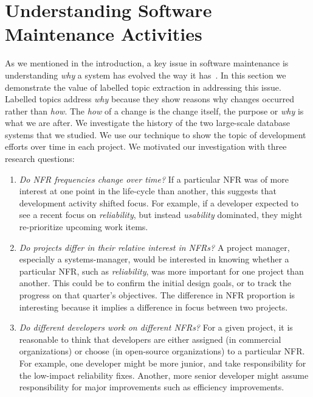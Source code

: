 \documentclass[smallextended]{svjour3}       %
\begin{document}
\section{Understanding Software Maintenance Activities} 
\label{sec:analysis}
As we mentioned in the introduction, a key issue in software maintenance is understanding \emph{why} a system has evolved the way it has~\cite{aranda09icse}. 
In this section we demonstrate the value of labelled topic extraction
in addressing this issue. 
Labelled topics address \emph{why}  because they show reasons why changes
occurred rather than \emph{how}. 
The \emph{how} of a change is the change itself, the purpose or
\emph{why} is what we are after.
We investigate the history of the two large-scale database systems that we studied. 
We use our technique to show the topic of development efforts over time in each project.
We motivated our investigation with three research questions:
\begin{enumerate}
\item \emph{Do NFR frequencies change over time?} If a particular NFR
  was of more interest at one point in the life-cycle than another,
  this suggests that development activity shifted focus. For example,
  if a developer expected to see a recent focus on \emph{reliability},
  but instead \emph{usability} dominated, they might re-prioritize
  upcoming work items.

\item \emph{Do projects differ in their relative interest in NFRs?} A
  project manager, especially a systems-manager, would be interested
  in knowing whether a particular NFR, such as \emph{reliability}, was
  more important for one project than another. This could be to
  confirm the initial design goals, or to track the progress on that
  quarter's objectives.  The difference in NFR proportion is
  interesting because it implies a difference in focus between two projects.

\item \emph{Do different developers work on different NFRs?} For a given project, it is reasonable to think that developers are either assigned
(in commercial organizations) or choose (in open-source organizations) to a particular NFR. For example, one developer might be more junior, and take
responsibility for the low-impact reliability fixes. Another, more senior developer might assume responsibility for major improvements such as efficiency
improvements. 

\end{enumerate}
\end{document}
